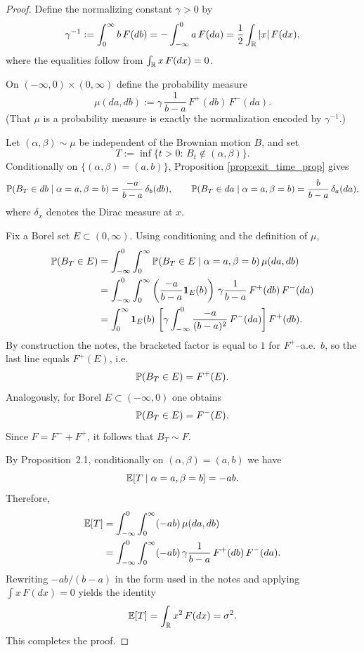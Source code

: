 \begin{proof}
Define the normalizing constant $\gamma>0$ by
\[
\gamma^{-1}
:= \int_{0}^{\infty} b\,F(db)
= -\int_{-\infty}^{0} a\,F(da)
= \frac12\int_{\mathbb{R}} |x|\,F(dx),
\]
where the equalities follow from $\int_{\mathbb{R}} x\,F(dx)=0$.

On $(-\infty,0)\times(0,\infty)$ define the probability measure
\[
\mu(da,db)
:= \gamma\,\frac{1}{b-a}\,F^+(db)\,F^-(da).
\]
(That $\mu$ is a probability measure is exactly the normalization encoded by $\gamma^{-1}$.)

Let $(\alpha,\beta)\sim\mu$ be independent of the Brownian motion $B$, and set
\[
T:=\inf\{t>0:\,B_t\notin(\alpha,\beta)\}.
\]
Conditionally on $\{(\alpha,\beta)=(a,b)\}$, Proposition \ref{prop:exit_time_prop} gives
\[
\mathbb{P}(B_T\in db\mid \alpha=a,\beta=b)=\frac{-a}{b-a}\,\delta_b(db),
\qquad
\mathbb{P}(B_T\in da\mid \alpha=a,\beta=b)=\frac{b}{b-a}\,\delta_a(da),
\]
where $\delta_x$ denotes the Dirac measure at $x$.

\medskip
{}
Fix a Borel set $E\subset(0,\infty)$. Using conditioning and the definition of $\mu$,
\begin{align*}
\mathbb{P}(B_T\in E)
&=\int_{-\infty}^{0}\int_{0}^{\infty}
\mathbb{P}(B_T\in E\mid \alpha=a,\beta=b)\,\mu(da,db)\\
&=\int_{-\infty}^{0}\int_{0}^{\infty}
\left(\frac{-a}{b-a}\mathbf{1}_E(b)\right)\,
\gamma\frac{1}{b-a}\,F^+(db)\,F^-(da)\\
&=\int_{0}^{\infty}\mathbf{1}_E(b)\,
\left[\gamma\int_{-\infty}^{0}\frac{-a}{(b-a)^2}\,F^-(da)\right]F^+(db).
\end{align*}
By construction the notes, the bracketed factor is equal to $1$ for $F^+$--a.e.\ $b$,
so the last line equals $F^+(E)$, i.e.
\[
\mathbb{P}(B_T\in E)=F^+(E).
\]
Analogously, for Borel $E\subset(-\infty,0)$ one obtains
\[
\mathbb{P}(B_T\in E)=F^-(E).
\]
Since $F=F^-+F^+$, it follows that $B_T\sim F$.

\medskip
{}
By Proposition~2.1, conditionally on $(\alpha,\beta)=(a,b)$ we have
\[
\mathbb{E}[T\mid \alpha=a,\beta=b]= -ab.
\]
Therefore,
\begin{align*}
\mathbb{E}[T]
&=\int_{-\infty}^{0}\int_{0}^{\infty} (-ab)\,\mu(da,db)\\
&=\int_{-\infty}^{0}\int_{0}^{\infty} (-ab)\,
\gamma\frac{1}{b-a}\,F^+(db)\,F^-(da).
\end{align*}
Rewriting $-ab/(b-a)$ in the form used in the notes and applying $\int x\,F(dx)=0$
yields the identity
\[
\mathbb{E}[T]=\int_{\mathbb{R}} x^2\,F(dx)=\sigma^2.
\]
This completes the proof.
\end{proof}

